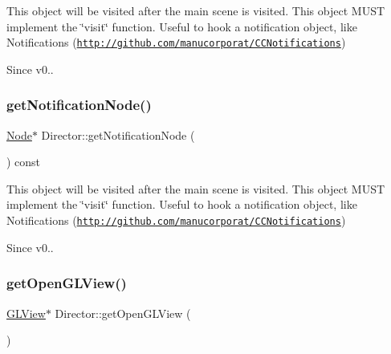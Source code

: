 This object will be visited after the main scene is visited. This object M\+U\+ST implement the \char`\"{}visit\char`\"{} function. Useful to hook a notification object, like Notifications (\href{http://github.com/manucorporat/CCNotifications}{\tt http\+://github.\+com/manucorporat/\+C\+C\+Notifications}) \begin{DoxySince}{Since}
v0.. 
\end{DoxySince}
\mbox{\label{classDirector_a33fe947ebf154c242198d3ad0d95cba4}} 
\subsubsection{\texorpdfstring{get\+Notification\+Node()}{getNotificationNode()}\hspace{0.1cm}{\footnotesize\ttfamily [2/2]}}
{\footnotesize\ttfamily \hyperlink{classNode}{Node}$\ast$ Director\+::get\+Notification\+Node (\begin{DoxyParamCaption}{ }\end{DoxyParamCaption}) const\hspace{0.3cm}{\ttfamily [inline]}}

This object will be visited after the main scene is visited. This object M\+U\+ST implement the \char`\"{}visit\char`\"{} function. Useful to hook a notification object, like Notifications (\href{http://github.com/manucorporat/CCNotifications}{\tt http\+://github.\+com/manucorporat/\+C\+C\+Notifications}) \begin{DoxySince}{Since}
v0.. 
\end{DoxySince}
\mbox{\label{classDirector_a9480a6fa03967568e72b392e2b53c599}} 
\subsubsection{\texorpdfstring{get\+Open\+G\+L\+View()}{getOpenGLView()}\hspace{0.1cm}{\footnotesize\ttfamily [1/2]}}
{\footnotesize\ttfamily \hyperlink{classGLView}{G\+L\+View}$\ast$ Director\+::get\+Open\+G\+L\+View (\begin{DoxyParamCaption}{ }\end{DoxyParamCaption})\hspace{0.3cm}{\ttfamily [inline]}}

